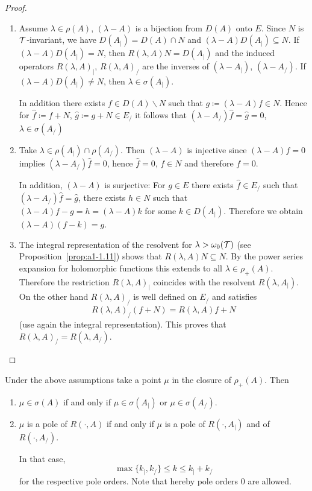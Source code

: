 \begin{proof}
\begin{enumerate}[\upshape (i), wide, labelindent=.25em]
\item 
Assume $\lambda \in \rho(A)$, \ie $(\lambda-A)$ is a bijection from $D(A)$ onto $E$.
Since $N$ is $\mathcal{T}$-invariant, we have $D(A_{|}) = D(A) \cap N$ and $(\lambda-A)D(A_{|}) \subseteq N$.
If\/ $(\lambda-A)D(A_{|}) = N$, then $R(\lambda,A)N = D(A_{|})$ and the induced operators $R(\lambda,A)_{|}$, \resp $R(\lambda,A)_{/}$ are the inverses of\/ $(\lambda-A_{|})$, \resp $(\lambda-A_{/})$.
If\/ $(\lambda-A)D(A_{|}) \neq N$, then $\lambda \in \sigma(A_{|})$.

In addition there exists $f \in D(A)\backslash N$ such that $g \coloneq (\lambda-A)f \in N$.
Hence for $\hat{f} \coloneq f+N$, $\hat{g} \coloneq g+N \in E_{/}$ it follows that $(\lambda-A_{/})\hat{f} = \hat{g} = 0$, \ie $\lambda \in \sigma(A_{/})$

\item 
Take $\lambda \in \rho(A_{|}) \cap \rho(A_{/})$.
Then $(\lambda-A)$ is injective since $(\lambda-A)f = 0$ implies $(\lambda-A_{/})\hat{f}= 0$, hence $\hat{f} = 0$, \ie $f \in N$ and therefore $f = 0$.

In addition, $(\lambda-A)$ is surjective: For $g \in E$ there exists $\hat{f} \in E_{/}$ such that $(\lambda-A_{/})\hat{f} = \hat{g}$, \ie there exists $h \in N$ such that $(\lambda-A)f - g = h = (\lambda-A)k$ for some $k \in D(A_{|})$.
Therefore we obtain $(\lambda-A)(f-k) = g$. 

\item 
The integral representation of the resolvent for $\lambda > \omega_{0}(\mathcal{T})$ (see Proposition~\ref{prop:a1-1.11}) shows that $R(\lambda,A)N \subseteq N$.
By the power series expansion for holomorphic functions this extends to all $\lambda \in \rho_{+}(A)$.
Therefore the restriction $R(\lambda,A)_{|}$ coincides with the resolvent $R(\lambda,A_{|})$.
On the other hand $R(\lambda,A)_{/}$ is well defined on $E_{/}$ and satisfies
\[
R(\lambda,A)_{/}(f+N) = R(\lambda,A)f + N
\]
(use again the integral representation).
This proves that $R(\lambda,A)_{/} = R(\lambda,A_{/})$.
\qedhere
\end{enumerate}
\end{proof}
\begin{corollary}\label{cor:a3-4.3}
Under the above assumptions take a point $\mu$ in the closure of\/ $\rho_{+}(A)$.
Then
\begin{enumerate}[\upshape (i)]
\item 
$\mu \in \sigma(A)$ if and only if\/ $\mu \in \sigma(A_{|})$ or $\mu \in \sigma(A_{/})$. 

\item 
$\mu$ is a pole of\/ $R(\cdot,A)$ if and only if\/ $\mu$ is a pole of\/ $R(\cdot,A_{|})$ and of\/ $R(\cdot,A_{/})$. 

In that case,
\[
\max\{k_{|},k_{/}\} \leq k \leq k_{|} + k_{/}
\]
for the respective pole orders. Note that hereby pole orders $0$ are allowed.
\end{enumerate}
\end{corollary}
